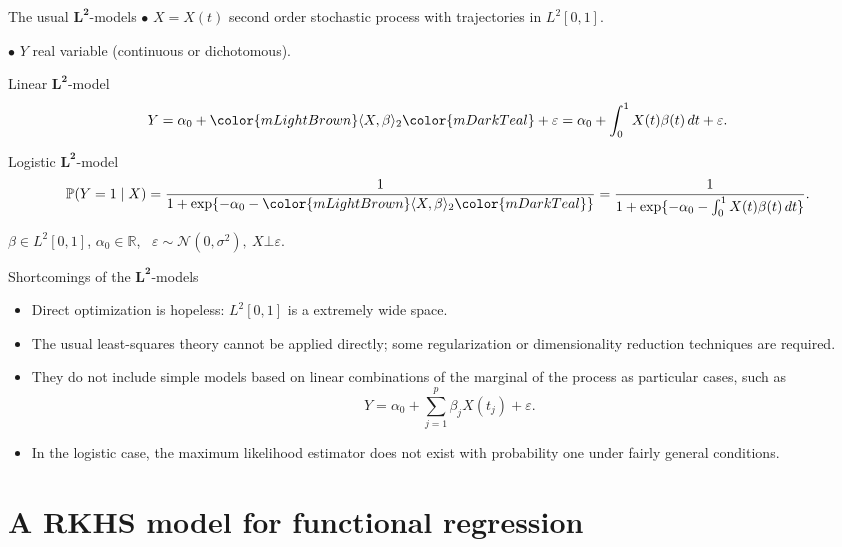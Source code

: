 \documentclass[9pt, english, professionalfonts]{beamer}
\newcommand\maroon[1]{\color{mLightBrown}#1\color{mDarkTeal}}
\begin{document}
\begin{frame}{The usual \(\bm{L^2}\)-models}
  \(\bullet\) \(X=X(t)\) second order stochastic process with trajectories in \(L^2[0, 1]\).

  \(\bullet\) \(Y\) real variable (continuous or dichotomous).

  \vspace{1em}

\begin{block}{Linear \(\bm{L^2}\)-model}
  \[
    Y = \alpha_0 + \maroon{\langle X, \beta \rangle_2} + \varepsilon = \alpha_0 + \int_0^1 X(t)\beta(t)\, dt + \varepsilon.
  \]
\end{block}

\begin{block}{Logistic \(\bm{L^2}\)-model}
    \[
    \mathbb P (Y=1\mid X) = \frac{1}{1 + \exp\{-\alpha_0 - \maroon{\langle X, \beta\rangle_2}\}} = \frac{1}{1 + \exp\{-\alpha_0 - \int_0^1 X(t)\beta(t)\, dt\}}.
  \]
\end{block}
  \maroon{\(\beta \in L^2[0,1]\)}, \(\alpha_0\in\mathbb R\), \ \(\varepsilon \sim \mathcal N(0, \sigma^2), \ X \bot \varepsilon\).

\end{frame}

\begin{frame}{Shortcomings of the \(\bm{L^2}\)-models}
  \begin{itemize}
    \item Direct optimization is hopeless: \(L^2[0,1]\) is a \maroon{extremely wide space}.
    \item The usual least-squares theory cannot be applied directly; some regularization or dimensionality reduction techniques are required.
    \item They do not include simple models based on linear combinations of the marginal of the process as particular cases, such as
    \[
      Y = \alpha_0 + \sum_{j=1}^p \beta_j X(t_j) + \varepsilon.
    \]
    \item In the logistic case, the maximum likelihood estimator does not exist with probability one under fairly general conditions.
  \end{itemize}
\end{frame}

\section{A RKHS model for functional regression}
\end{document}
